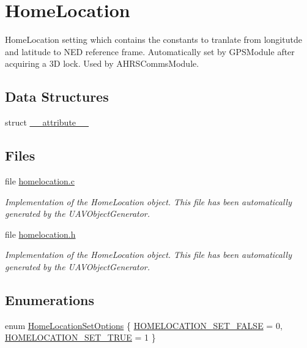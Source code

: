 \hypertarget{group___home_location}{\section{\-Home\-Location}
\label{group___home_location}
}


\-Home\-Location setting which contains the constants to tranlate from longitutde and latitude to \-N\-E\-D reference frame. \-Automatically set by \-G\-P\-S\-Module after acquiring a 3\-D lock. \-Used by \-A\-H\-R\-S\-Comms\-Module.  


\subsection*{\-Data \-Structures}
\begin{DoxyCompactItemize}
\item 
struct \hyperlink{struct____attribute____}{\-\_\-\-\_\-attribute\-\_\-\-\_\-}
\end{DoxyCompactItemize}
\subsection*{\-Files}
\begin{DoxyCompactItemize}
\item 
file \hyperlink{homelocation_8c}{homelocation.\-c}
\begin{DoxyCompactList}\small\item\em \-Implementation of the \-Home\-Location object. \-This file has been automatically generated by the \-U\-A\-V\-Object\-Generator. \end{DoxyCompactList}\item 
file \hyperlink{homelocation_8h}{homelocation.\-h}
\begin{DoxyCompactList}\small\item\em \-Implementation of the \-Home\-Location object. \-This file has been automatically generated by the \-U\-A\-V\-Object\-Generator. \end{DoxyCompactList}\end{DoxyCompactItemize}
\subsection*{\-Enumerations}
\begin{DoxyCompactItemize}
\item 
enum \hyperlink{group___home_location_gaafc69a438eb9559e75dea074dbd94ef2}{\-Home\-Location\-Set\-Options} \{ \hyperlink{group___home_location_ggaafc69a438eb9559e75dea074dbd94ef2a6841b255b64db1a98869cd41b32a2569}{\-H\-O\-M\-E\-L\-O\-C\-A\-T\-I\-O\-N\-\_\-\-S\-E\-T\-\_\-\-F\-A\-L\-S\-E} = 0, 
\hyperlink{group___home_location_ggaafc69a438eb9559e75dea074dbd94ef2a60c850ccfda2af825023adf13a9312b3}{\-H\-O\-M\-E\-L\-O\-C\-A\-T\-I\-O\-N\-\_\-\-S\-E\-T\-\_\-\-T\-R\-U\-E} = 1
 \}
\end{DoxyCompactItemize}
